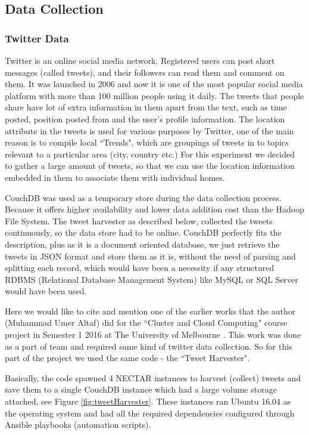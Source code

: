\documentclass[12pt]{report}
\theoremstyle{named}
\begin{document}
\subsection{Data Collection}
\label{sec:DataCollection}
\subsubsection{Twitter Data}
Twitter is an online social media network. Registered users can post short messages (called tweets), and their followers can read them and comment on them. It was launched in 2006 and now it is one of the most popular social media platform with more than 100 million people using it daily. The tweets that people share have lot of extra information in them apart from the text, such as time posted, position posted from and the user's profile information. The location attribute in the tweets is used for various purposes by Twitter, one of the main reason is to compile local ``Trends", which are groupings of tweets in to topics relevant to a particular area (city, country etc.) For this experiment we decided to gather a large amount of tweets, so that we can use the location information embedded in them to associate them with individual homes.

CouchDB was used as a temporary store during the data collection process. Because it offers higher availability and lower data addition cost than the Hadoop File System. The tweet harvester as described below, collected the tweets continuously, so the data store had to be online. CouchDB perfectly fits the description, plus as it is a document oriented database, we just retrieve the tweets in JSON format and store them as it is, without the need of parsing and splitting each record, which would have been a necessity if any structured RDBMS (Relational Database Management System) like MySQL or SQL Server would have been used.

Here we would like to cite and mention one of the earlier works that the author (Muhammad Umer Altaf) did for the ``Cluster and Cloud Computing" course project in Semester 1 2016 at The University of Melbourne \cite{clusterCloudReport}. This work was done as a part of team and required same kind of twitter data collection. So for this part of the project we used the same code - the ``Tweet Harvester".

Basically, the code spawned 4 NECTAR instances to harvest (collect) tweets and save them to a single CouchDB instance which had a large volume storage attached, see Figure \ref{fig:tweetHarvester}. These instances ran Ubuntu 16.04 as the operating system and had all the required dependencies configured through Ansible playbooks (automation scripts).
\end{document}
